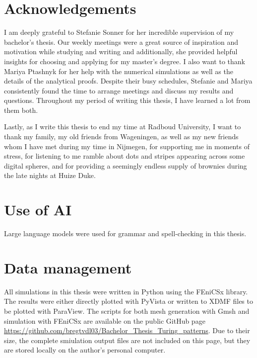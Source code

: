 \documentclass[oneside]{book}
\begin{document}
\restoregeometry

\clearpage
\section*{Acknowledgements}

I am deeply grateful to Stefanie Sonner for her incredible supervision of my bachelor's thesis. Our weekly meetings were a great source of inspiration and motivation while studying and writing and additionally, she provided helpful insights for choosing and applying for my master's degree. I also want to thank Mariya Ptashnyk for her help with the numerical simulations as well as the details of the analytical proofs. Despite their busy schedules, Stefanie and Mariya consistently found the time to arrange meetings and discuss my results and questions. Throughout my period of writing this thesis, I have learned a lot from them both.

Lastly, as I write this thesis to end my time at Radboud University, I want to thank my family, my old friends from Wageningen, as well as my new friends whom I have met during my time in Nijmegen, for supporting me in moments of stress, for listening to me ramble about dots and stripes appearing across some digital spheres, and for providing a seemingly endless supply of brownies during the late nights at Huize Duke.

\clearpage
\section*{Use of AI}
Large language models were used for grammar and spell-checking in this thesis.

\section*{Data management}
All simulations in this thesis were written in Python using the FEniCSx library. The results were either directly plotted with PyVista or written to XDMF files to be plotted with ParaView. The scripts for both mesh generation with Gmsh and simulation with FEniCSx are available on the public GitHub page \url{https://github.com/bregtvdl03/Bachelor_Thesis_Turing_patterns}. Due to their size, the complete smiulation output files are not included on this page, but they are stored locally on the author's personal computer.

\tableofcontents

\clearpage
\end{document}

